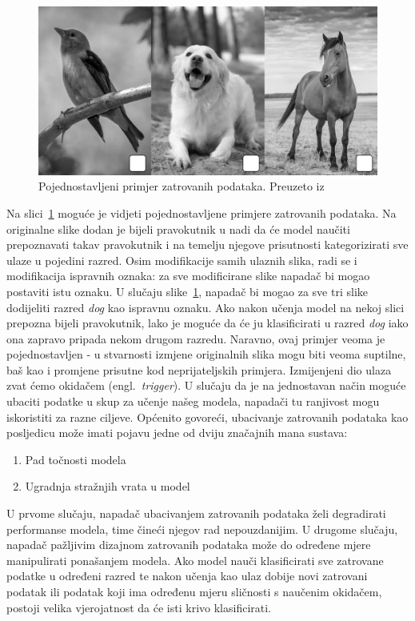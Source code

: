 \documentclass[times, utf8, zavrsni, numeric]{fer}
\begin{document}
\begin{figure}[htb]
    \centering
    \includegraphics[scale=0.4]{poisoned_img.png}
    \caption{Pojednostavljeni primjer zatrovanih podataka. Preuzeto iz \cite{menon2023poisoned}}
    \label{fig:poisoned_imgs}
\end{figure}

Na slici~\ref{fig:poisoned_imgs} moguće je vidjeti pojednostavljene primjere zatrovanih podataka. 
Na originalne slike dodan je bijeli pravokutnik u nadi da će model naučiti prepoznavati takav pravokutnik i na temelju njegove prisutnosti kategorizirati sve ulaze u pojedini razred.
Osim modifikacije samih ulaznih slika, radi se i modifikacija ispravnih oznaka: za sve modificirane slike napadač bi mogao postaviti istu oznaku.
U slučaju slike~\ref{fig:poisoned_imgs}, napadač bi mogao za sve tri slike dodijeliti razred \textit{dog} kao ispravnu oznaku. 
Ako nakon učenja model na nekoj slici prepozna bijeli pravokutnik, lako je moguće da će ju klasificirati u razred \textit{dog} iako ona zapravo pripada nekom drugom razredu.
Naravno, ovaj primjer veoma je pojednostavljen - u stvarnosti izmjene originalnih slika mogu biti veoma suptilne, baš kao i promjene prisutne kod neprijateljskih primjera.
Izmijenjeni dio ulaza zvat ćemo okidačem (engl.\ \textit{trigger}).
U slučaju da je na jednostavan način moguće ubaciti podatke u skup za učenje našeg modela, napadači tu ranjivost mogu iskoristiti za razne ciljeve.
Općenito govoreći, ubacivanje zatrovanih podataka kao posljedicu može imati pojavu jedne od dviju značajnih mana sustava:

\begin{enumerate}
    \item Pad točnosti modela
    \item Ugradnja stražnjih vrata u model
\end{enumerate}

U prvome slučaju, napadač ubacivanjem zatrovanih podataka želi degradirati performanse modela, time čineći njegov rad nepouzdanijim.
U drugome slučaju, napadač pažljivim dizajnom zatrovanih podataka može do određene mjere manipulirati ponašanjem modela. 
Ako model nauči klasificirati sve zatrovane podatke u određeni razred te nakon učenja kao ulaz dobije novi zatrovani podatak ili podatak koji ima određenu mjeru sličnosti s naučenim okidačem,
postoji velika vjerojatnost da će isti krivo klasificirati.  
\end{document}
